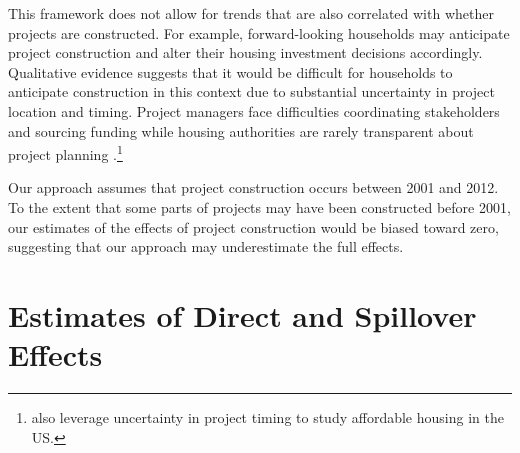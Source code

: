 \documentclass[12pt]{article}
\begin{document}
This framework does not allow for trends that are also correlated with whether projects are constructed.  For example, forward-looking households may anticipate project construction and alter their housing investment decisions accordingly.  Qualitative evidence suggests that it would be difficult for households to anticipate construction in this context due to substantial uncertainty in project location and timing.  Project managers face difficulties coordinating stakeholders and sourcing funding while housing authorities are rarely transparent about project planning \citep{serihistory}.\footnote{\cite{diamond2016wants} also leverage uncertainty in project timing to study affordable housing in the US.} 

Our approach assumes that project construction occurs between 2001 and 2012.  To the extent that some parts of projects may have been constructed before 2001, our estimates of the effects of project construction would be biased toward zero, suggesting that our approach may underestimate the full effects.



\section{Estimates of Direct and Spillover Effects}\label{section:results}




\end{document}
